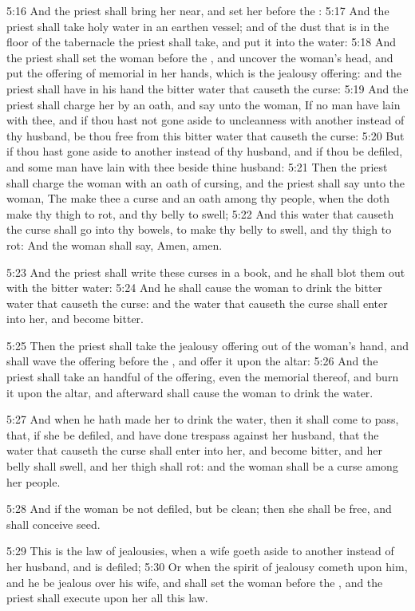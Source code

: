 5:16 And the priest shall bring her near, and set her before the \LORD: 5:17 And the priest shall take holy water in an earthen vessel; and of the dust that is in the floor of the tabernacle the priest shall take, and put it into the water: 5:18 And the priest shall set the woman before the \LORD, and uncover the woman's head, and put the offering of memorial in her hands, which is the jealousy offering: and the priest shall have in his hand the bitter water that causeth the curse: 5:19 And the priest shall charge her by an oath, and say unto the woman, If no man have lain with thee, and if thou hast not gone aside to uncleanness with another instead of thy husband, be thou free from this bitter water that causeth the curse: 5:20 But if thou hast gone aside to another instead of thy husband, and if thou be defiled, and some man have lain with thee beside thine husband: 5:21 Then the priest shall charge the woman with an oath of cursing, and the priest shall say unto the woman, The \LORD make thee a curse and an oath among thy people, when the \LORD doth make thy thigh to rot, and thy belly to swell; 5:22 And this water that causeth the curse shall go into thy bowels, to make thy belly to swell, and thy thigh to rot: And the woman shall say, Amen, amen.

5:23 And the priest shall write these curses in a book, and he shall blot them out with the bitter water: 5:24 And he shall cause the woman to drink the bitter water that causeth the curse: and the water that causeth the curse shall enter into her, and become bitter.

5:25 Then the priest shall take the jealousy offering out of the woman's hand, and shall wave the offering before the \LORD, and offer it upon the altar: 5:26 And the priest shall take an handful of the offering, even the memorial thereof, and burn it upon the altar, and afterward shall cause the woman to drink the water.

5:27 And when he hath made her to drink the water, then it shall come to pass, that, if she be defiled, and have done trespass against her husband, that the water that causeth the curse shall enter into her, and become bitter, and her belly shall swell, and her thigh shall rot: and the woman shall be a curse among her people.

5:28 And if the woman be not defiled, but be clean; then she shall be free, and shall conceive seed.

5:29 This is the law of jealousies, when a wife goeth aside to another instead of her husband, and is defiled; 5:30 Or when the spirit of jealousy cometh upon him, and he be jealous over his wife, and shall set the woman before the \LORD, and the priest shall execute upon her all this law.

